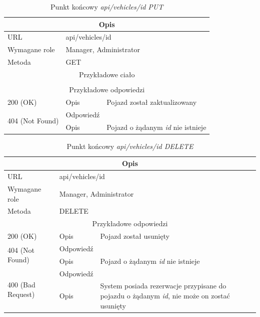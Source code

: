 \documentclass[eng,printmode,openany]{mgr}
\begin{document}
	\begin{table}[H]
		\caption{Punkt końcowy \textit{api/vehicles/id PUT}}
		\begin{tabularx}{\textwidth}{|l|l|X|}
			\hline
			\multicolumn{3}{|c|}{Opis}                         							\\ \hline
			URL                       & \multicolumn{2}{l|}{api/vehicles/id} 			\\ \hline
			Wymagane role             & \multicolumn{2}{l|}{Manager, Administrator} 	\\ \hline		
			Metoda                    & \multicolumn{2}{l|}{GET} 						\\ \hline
			\multicolumn{3}{|c|}{Przykładowe ciało}         							\\ \hline
			\multicolumn{3}{|c|}{} 										\\ \hline
			\multicolumn{3}{|c|}{Przykładowe odpowiedzi}                   															\\ \hline
			200 (OK)			& Opis         	& Pojazd został zaktualizowany 														\\ \hline
			\multirow{2}{*}{404 (Not Found)} 	& Odpowiedź 	&      \\ \cline{2-3} 
			& Opis          & Pojazd o żądanym \textit{id} nie istnieje  										\\ \hline
		\end{tabularx}
	\end{table}
	
	\begin{table}[H]
		\caption{Punkt końcowy \textit{api/vehicles/id DELETE}}
		\begin{tabularx}{\textwidth}{|l|l|X|}
			\hline
			\multicolumn{3}{|c|}{Opis}                         						\\ \hline
			URL                       & \multicolumn{2}{l|}{api/vehicles/id} 		\\ \hline
			Wymagane role             & \multicolumn{2}{l|}{Manager, Administrator} \\ \hline
			Metoda                    & \multicolumn{2}{l|}{DELETE} 				\\ \hline
			\multicolumn{3}{|c|}{ Przykładowe odpowiedzi}                   		\\ \hline
			200 (OK)			& Opis         	& Pojazd został usunięty			\\ 	\hline
			\multirow{2}{*}{404 (Not Found)} 	& Odpowiedź     &      	\\ \cline{2-3} 
			& Opis          & Pojazd o żądanym \textit{id} nie istnieje  											\\ \hline
			\multirow{2}{*}{400 (Bad Request)} 	& Odpowiedź     &      	\\ \cline{2-3} 
			& Opis          & System posiada rezerwacje przypisane do pojazdu o żądanym \textit{id}, nie może on zostać usunięty				\\ \hline
		\end{tabularx}
	\end{table}
	
\end{document}
